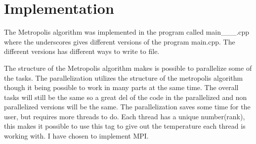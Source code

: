 \section{Implementation}

The Metropolis algorithm was implemented in the program called main\_\_\_.cpp where the underscores gives different versions of the program main.cpp. The different versions has different ways to write to file.


The structure of the Metropolis algorithm makes is possible to parallelize some of the tasks. The parallelization utilizes the structure of the metropolis algorithm though it being possible to work in many parts at the same time. The overall tasks will still be the same so a great del of the code in the parallelized and non parallelized versions will be the same. The parallelization saves some time for the user, but requires more threads to do. Each thread has a unique number(rank), this makes it possible to use this tag to give out the temperature each thread is working with. I have chosen to implement MPI.



